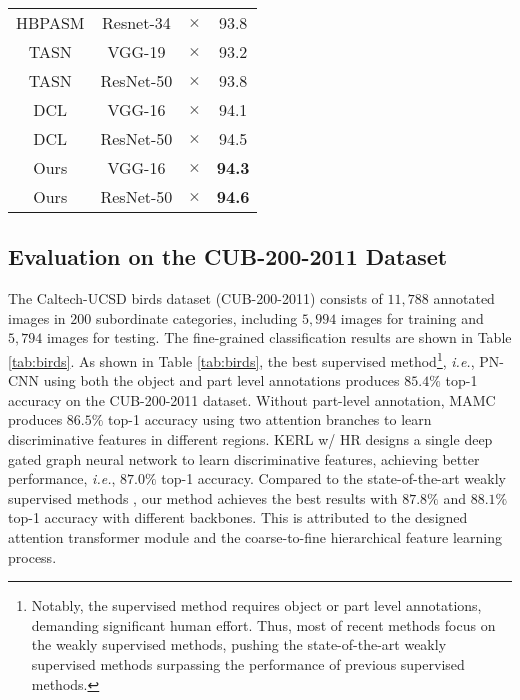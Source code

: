 \documentclass[10pt,twocolumn,letterpaper]{article}
\def\ie{{\em i.e.}}
\begin{document}
\begin{table}[t]
{\begin{tabular}{cccc}
    	             HBPASM \cite{8805063}              &  Resnet-34   &  $\times$  &      93.8       \\
    	 TASN \cite{DBLP:journals/corr/abs-1903-06150}  &    VGG-19    &  $\times$  &      93.2       \\
    	 TASN \cite{DBLP:journals/corr/abs-1903-06150}  &  ResNet-50   &  $\times$  &      93.8       \\
    	           DCL \cite{Chen_2019_CVPR}            &    VGG-16    &  $\times$  &      94.1       \\
    	           DCL \cite{Chen_2019_CVPR}            &  ResNet-50   &  $\times$  &      94.5       \\
	           \hline
    	                     Ours                       &    VGG-16    &  $\times$  &  \textbf{94.3}  \\
    	                     Ours                       &  ResNet-50   &  $\times$  &  \textbf{94.6}  \\ \bottomrule
    \end{tabular}}
\end{table}


\subsection{Evaluation on the CUB-200-2011 Dataset}
The Caltech-UCSD birds dataset (CUB-200-2011) \cite{report-wahcub_200_2011} consists of $11,788$ annotated images in $200$ subordinate categories, including $5,994$ images for training and $5,794$ images for testing. The fine-grained classification results are shown in Table \ref{tab:birds}. As shown in Table \ref{tab:birds}, the best supervised method\footnote{Notably, the supervised method requires object or part level annotations, demanding significant human effort. Thus, most of recent methods focus on the weakly supervised methods, pushing the state-of-the-art weakly supervised methods surpassing the performance of previous supervised methods.}, \ie, PN-CNN \cite{DBLP:journals/corr/BransonHBP14} using both the object and part level annotations produces $85.4\%$ top-1 accuracy on the CUB-200-2011 dataset. Without part-level annotation, MAMC \cite{DBLP:conf/eccv/SunYZD18} produces $86.5\%$ top-1 accuracy using two attention branches to learn discriminative features in different regions. KERL w/ HR \cite{DBLP:conf/ijcai/ChenLCWL18} designs a single deep gated graph neural network to learn discriminative features, achieving better performance, \ie, $87.0\%$ top-1 accuracy. Compared to the state-of-the-art weakly supervised methods \cite{DBLP:conf/ijcai/ChenLCWL18,DBLP:conf/nips/DubeyGRN18,DBLP:conf/eccv/SunYZD18,DBLP:conf/cvpr/WangMD18,Chen_2019_CVPR,DBLP:journals/corr/abs-1903-06150}, our method achieves the best results with $87.8\%$ and $88.1\%$ top-1 accuracy with different backbones. This is attributed to the designed attention transformer module and the coarse-to-fine hierarchical feature learning process. 
\end{document}
